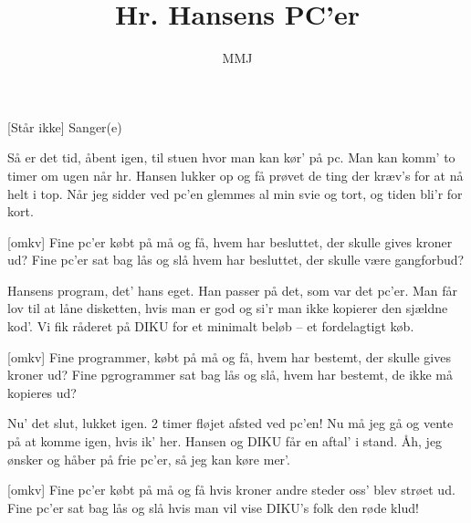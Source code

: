 \documentclass[a4paper,11pt]{article}
\title{Hr. Hansens PC'er}
\author{MMJ}
\begin{document}
\maketitle

\begin{roles}
[Står ikke] Sanger(e)
\end{roles}


\begin{song}
%
Så er det tid,
åbent igen,
til stuen hvor man kan kør' på pc.
Man kan komm' to timer om ugen
når hr. Hansen lukker op
og få prøvet de ting der kræv's for at nå helt i top.
Når jeg sidder ved pc'en
glemmes al min svie og tort,
og tiden bli'r for kort.

[omkv]%
Fine pc'er købt på må og få,
hvem har besluttet, der skulle gives kroner ud?
Fine pc'er sat bag lås og slå
hvem har besluttet, der skulle være gangforbud?

%
Hansens program,
det' hans eget.
Han passer på det, som var det pc'er.
Man får lov til at låne disketten,
hvis man er god
og si'r man ikke kopierer
den sjældne kod'.
Vi fik råderet på DIKU
for et minimalt beløb --
et fordelagtigt køb.

[omkv]%
Fine programmer, købt på må og få,
hvem har bestemt, der skulle gives kroner ud?
Fine pgrogrammer sat bag lås og slå,
hvem har bestemt, de ikke må kopieres ud?

%
Nu' det slut,
lukket igen.
2 timer fløjet afsted ved pc'en!
Nu må jeg gå og vente på at komme igen,
hvis ik' her. Hansen og DIKU får en aftal' i stand.
Åh, jeg ønsker og håber på frie pc'er,
så jeg kan køre mer'.

[omkv]%
Fine pc'er købt på må og få
hvis kroner andre steder oss' blev strøet ud.
Fine pc'er sat bag lås og slå
hvis man vil vise DIKU's folk den røde klud!
\end{song}
\end{document}
